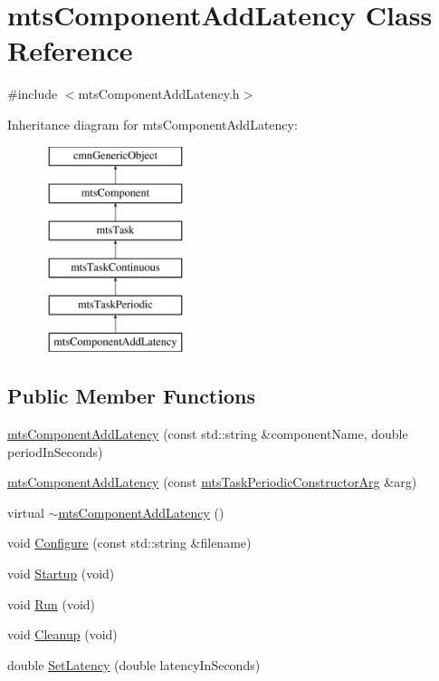 \hypertarget{classmts_component_add_latency}{}\section{mts\+Component\+Add\+Latency Class Reference}
\label{classmts_component_add_latency}


{\ttfamily \#include $<$mts\+Component\+Add\+Latency.\+h$>$}

Inheritance diagram for mts\+Component\+Add\+Latency\+:\begin{figure}[H]
\begin{center}
\leavevmode
\includegraphics[height=6.000000cm]{d5/d00/classmts_component_add_latency}
\end{center}
\end{figure}
\subsection*{Public Member Functions}
\begin{DoxyCompactItemize}
\item 
\hyperlink{classmts_component_add_latency_a5e9722e59155cf09209eafccbd263632}{mts\+Component\+Add\+Latency} (const std\+::string \&component\+Name, double period\+In\+Seconds)
\item 
\hyperlink{classmts_component_add_latency_a56dfb464eba7d24819479e05b7323e53}{mts\+Component\+Add\+Latency} (const \hyperlink{classmts_task_periodic_constructor_arg}{mts\+Task\+Periodic\+Constructor\+Arg} \&arg)
\item 
virtual \hyperlink{classmts_component_add_latency_a345ba0d0ee9b30281f93f2c631a25664}{$\sim$mts\+Component\+Add\+Latency} ()
\item 
void \hyperlink{classmts_component_add_latency_aa1c5b4df35aa09a667383bd53ef22518}{Configure} (const std\+::string \&filename)
\item 
void \hyperlink{classmts_component_add_latency_ad854921041145afcf9b88d8802b16095}{Startup} (void)
\item 
void \hyperlink{classmts_component_add_latency_a0991c25360c716a374fc8c2543840688}{Run} (void)
\item 
void \hyperlink{classmts_component_add_latency_a4cfe3d9a65d29a7a601eb508bf50076c}{Cleanup} (void)
\item 
double \hyperlink{classmts_component_add_latency_aa3d6d2e75bb2a37627a61f22cc68ac06}{Set\+Latency} (double latency\+In\+Seconds)
\end{DoxyCompactItemize}
